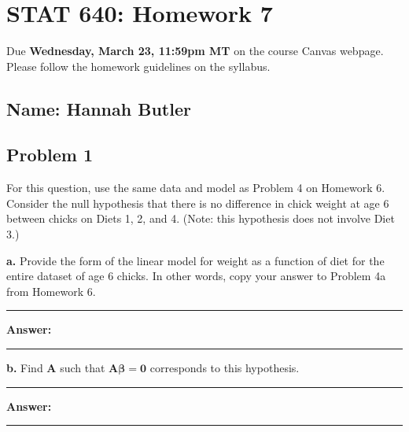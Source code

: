 \documentclass[
]{article}
\author{}
\date{\vspace{-2.5em}}
\newcommand{\bmA}{\ensuremath{\bm A}}
\newcommand{\bmbeta}{\ensuremath{\bm{\beta}}}
\begin{document}
\hypertarget{stat-640-homework-7}{%
\section{STAT 640: Homework 7}\label{stat-640-homework-7}}

Due \textbf{Wednesday, March 23, 11:59pm MT} on the course Canvas
webpage. Please follow the homework guidelines on the syllabus.

\hypertarget{name-hannah-butler}{%
\subsection{Name: Hannah Butler}\label{name-hannah-butler}}

\hypertarget{section}{%
\subsection{}\label{section}}

\hypertarget{problem-1}{%
\subsection{Problem 1}\label{problem-1}}

For this question, use the same data and model as Problem 4 on Homework
6. Consider the null hypothesis that there is no difference in chick
weight at age 6 between chicks on Diets 1, 2, and 4. (Note: this
hypothesis does not involve Diet 3.)

\textbf{a.} Provide the form of the linear model for weight as a
function of diet for the entire dataset of age 6 chicks. In other words,
copy your answer to Problem 4a from Homework 6.

\begin{center}\rule{0.5\linewidth}{0.5pt}\end{center}

\textbf{Answer:}

\begin{center}\rule{0.5\linewidth}{0.5pt}\end{center}

\textbf{b.} Find \(\bmA\) such that \(\bmA\bmbeta = \bm0\) corresponds
to this hypothesis.

\begin{center}\rule{0.5\linewidth}{0.5pt}\end{center}

\textbf{Answer:}

\begin{center}\rule{0.5\linewidth}{0.5pt}\end{center}
\end{document}

